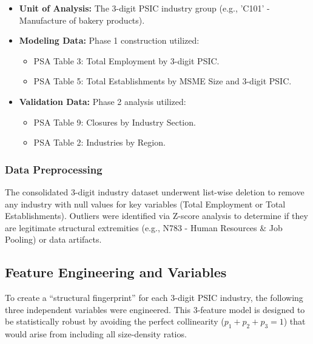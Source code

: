 \documentclass[acmtog, nonacm]{acmart}
\begin{document}
\begin{itemize}
    \item \textbf{Unit of Analysis:} The 3-digit PSIC industry group (e.g., 'C101' - Manufacture of bakery products).
    \item \textbf{Modeling Data:} Phase 1 construction utilized:
    \begin{itemize}
        \item PSA Table 3: Total Employment by 3-digit PSIC.
        \item PSA Table 5: Total Establishments by MSME Size and 3-digit PSIC.
    \end{itemize}
    \item \textbf{Validation Data:} Phase 2 analysis utilized:
    \begin{itemize}
        \item PSA Table 9: Closures by Industry Section.
        \item PSA Table 2: Industries by Region.
    \end{itemize}
\end{itemize}

\subsubsection{Data Preprocessing}
The consolidated 3-digit industry dataset underwent list-wise deletion to remove any industry with null values for key variables (Total Employment or Total Establishments). Outliers were identified via Z-score analysis to determine if they are legitimate structural extremities (e.g., N783 - Human Resources \& Job Pooling) or data artifacts.

\subsection{Feature Engineering and Variables}
To create a ``structural fingerprint'' for each 3-digit PSIC industry, the following three independent variables were engineered. This 3-feature model is designed to be statistically robust by avoiding the perfect collinearity ($p_1+p_2+p_3=1$) that would arise from including all size-density ratios.
\end{document}
